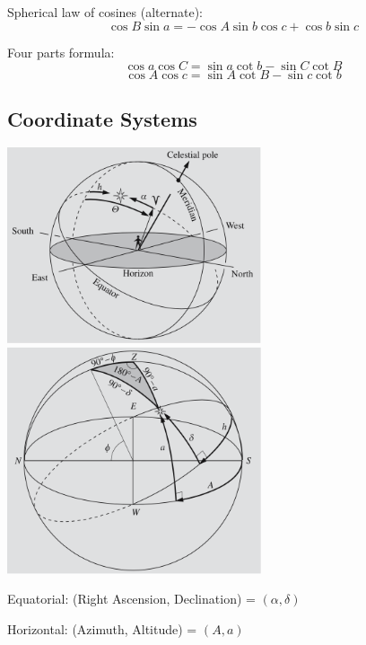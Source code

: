 \documentclass[12pt]{article}
\begin{document}
Spherical law of cosines (alternate): 
\begin{equation*}
    \cos{B}\sin{a} = -\cos{A}\sin{b}\cos{c}+\cos{b}\sin{c}
\end{equation*}

Four parts formula: 
\begin{equation*}
    \cos{a}\cos{C} = \sin{a}\cot{b} - \sin{C}\cot{B}
\end{equation*}
\begin{equation*}
    \cos{A}\cos{c} = \sin{A}\cot{B} - \sin{c}\cot{b}
\end{equation*}

\subsection{Coordinate Systems}


\begin{center}
\includegraphics[width=7.5cm]{images/rah.png}
\includegraphics[width=7.5cm]{images/conversion.png}
\end{center}

Equatorial: (Right Ascension, Declination) = $(\alpha, \delta)$

Horizontal: (Azimuth, Altitude) = $(A, a)$
\end{document}
